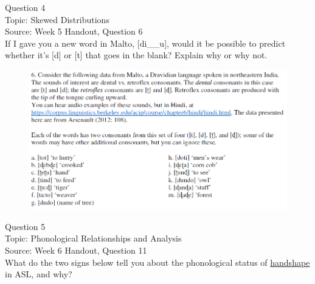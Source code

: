 \documentclass[12pt]{article}
\begin{document}
{\large Question 4}\\

Topic: Skewed Distributions\\
Source: Week 5 Handout, Question 6\\

If I gave you a new word in Malto, [di\_\_u], would it be possible to predict whether it's [d] or [t] that goes in the blank? Explain why or why not.\\

\begin{figure}[H]
\includegraphics{../images/malto.png}
\end{figure}

\newpage

{\large Question 5}\\

Topic: Phonological Relationships and Analysis\\
Source: Week 6 Handout, Question 11\\

What do the two signs below tell you about the phonological status of \underline{handshape} in ASL, and why?\\
\end{document}
